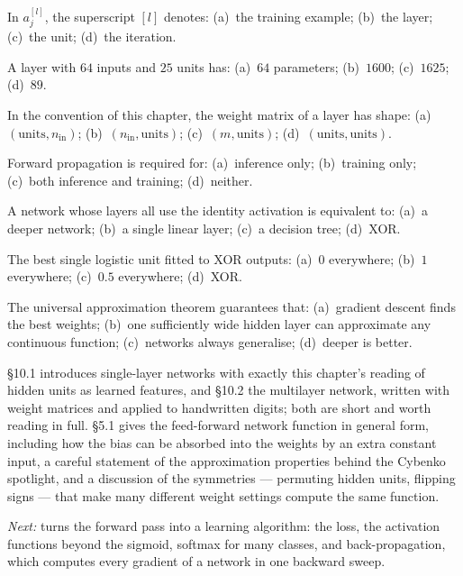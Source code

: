 \qz In $a^{[l]}_j$, the superscript $[l]$ denotes: (a)~the training example;
(b)~the layer; (c)~the unit; (d)~the iteration.

\qz A layer with $64$ inputs and $25$ units has: (a)~$64$ parameters; (b)~$1600$;
(c)~$1625$; (d)~$89$.

\qz In the convention of this chapter, the weight matrix of a layer has shape:
(a)~$(\text{units}, n_{\text{in}})$; (b)~$(n_{\text{in}}, \text{units})$;
(c)~$(m, \text{units})$; (d)~$(\text{units}, \text{units})$.

\qz Forward propagation is required for: (a)~inference only; (b)~training only;
(c)~both inference and training; (d)~neither.

\qz A network whose layers all use the identity activation is equivalent to:
(a)~a deeper network; (b)~a single linear layer; (c)~a decision tree; (d)~XOR.

\qz The best single logistic unit fitted to XOR outputs: (a)~$0$ everywhere;
(b)~$1$ everywhere; (c)~$0.5$ everywhere; (d)~XOR.

\qz The universal approximation theorem guarantees that: (a)~gradient descent
finds the best weights; (b)~one sufficiently wide hidden layer can approximate
any continuous function; (c)~networks always generalise; (d)~deeper is better.

\furtherreading

\textcite{james2021} §10.1 introduces single-layer networks with exactly this
chapter's reading of hidden units as learned features, and §10.2 the multilayer
network, written with weight matrices and applied to handwritten digits; both
are short and worth reading in full. \textcite{bishop2006} §5.1 gives the
feed-forward network function in general form, including how the bias can be
absorbed into the weights by an extra constant input, a careful statement of the
approximation properties behind the Cybenko spotlight, and a discussion of the
symmetries --- permuting hidden units, flipping signs --- that make many different
weight settings compute the same function.

\bigskip
\noindent\emph{Next:}  turns the forward pass into a learning
algorithm: the loss, the activation functions beyond the sigmoid, softmax for
many classes, and back-propagation, which computes every gradient of a network in
one backward sweep.
